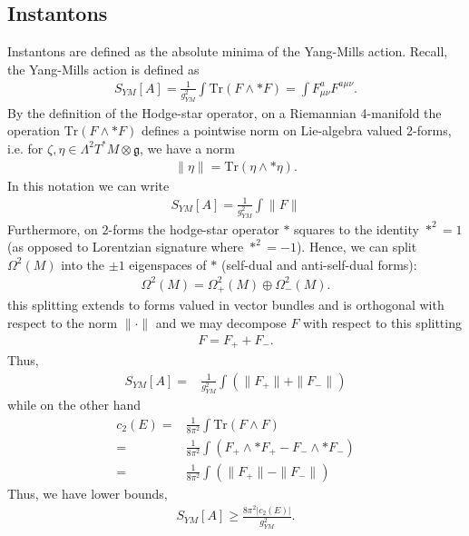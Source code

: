 \documentclass[12pt, onecolumn]{article}
\begin{document}
\subsection{Instantons}
\label{sec_instanton}
Instantons are defined as the absolute minima of the Yang-Mills action.  Recall, the Yang-Mills action is defined as
\begin{align*}
S_{YM}[A]=\frac{1}{g_{YM}^2}\int \text{Tr}\left(F \wedge * F \right) =\int F^{a}_{\mu \nu}F^{a \mu \nu}.
\end{align*}
By the definition of the Hodge-star operator, on a Riemannian 4-manifold the operation $\text{Tr}\left(F \wedge * F \right)$ defines a pointwise norm on Lie-algebra valued 2-forms, i.e. for $\zeta,\eta \in \Lambda^2 T^*M \otimes \mathfrak{g}$, we have a norm
\begin{align*}
\|\eta\|  = \text{Tr}(\eta \wedge * \eta).
\end{align*}
In this notation we can write
\begin{align*}
S_{YM}[A]=\frac{1}{g_{YM}^2}\int \|F\|
\end{align*}
Furthermore, on $2$-forms the hodge-star operator $*$ squares to the identity $*^2=1$ (as opposed to Lorentzian signature where $*^2=-1$).  Hence, we can split $\Omega^{2}(M)$ into the $\pm 1$ eigenspaces of $*$ (self-dual and anti-self-dual forms):
\begin{align*}
\Omega^2(M) = \Omega^2_{+}(M) \oplus \Omega^{2}_{-}(M).
\end{align*}
this splitting extends to forms valued in vector bundles and is orthogonal with respect to the norm $\|\cdot\|$ and we may decompose $F$ with respect to this splitting
\begin{align*}
F=F_{+}+F_{-}.
\end{align*}
Thus,
\begin{align*}
S_{YM}[A]=& \frac{1}{g_{YM}^2}\int\left(\|F_{+}\|+\|F_{-}\| \right)
\end{align*}
while on the other hand
\begin{align*}
c_{2}(E)=&\frac{1}{8\pi^2}\int \text{Tr}(F \wedge F)\\
=&\frac{1}{8\pi^2}\int \left(F_{+} \wedge * F_{+}-F_{-} \wedge *F_{-} \right)\\
=&\frac{1}{8\pi^2}\int \left(\|F_{+}\| -\|F_{-}\| \right)
\end{align*}
Thus, we have lower bounds,
\begin{align*}
S_{YM}[A] \geq \frac{8\pi^2|c_{2}(E)|}{g_{YM}^2}.
\end{align*}
\end{document}
